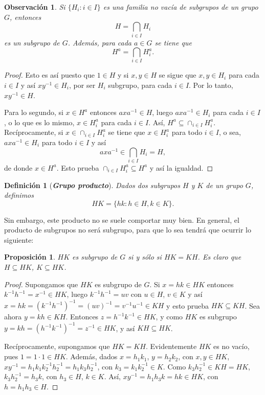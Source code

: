 \documentclass[12pt]{article}
\newtheorem{proposition}[theorem]{Proposición}
\newtheorem{definition}[theorem]{Definición}
\newtheorem{observation}{Observación}[theorem]
\begin{document}
\begin{observation}\label{ob:intGru} Si $\lbrace H_i : i \in I \rbrace$ es una familia no vacía de subgrupos de un grupo $G$, entonces $$H = \bigcap_{i \in I} H_i$$ es un subgrupo de $G$. Además, para cada $a \in G$ se tiene que $$H ^a = \bigcap_{i \in I} H_i^a.$$
\end{observation}
\begin{proof}
Esto es así puesto que $1 \in H$ y si $x,y \in H$ se sigue que $x,y \in H_i$ para cada $i \in I$ y así $xy^{-1} \in H_i$, por ser $H_i$ subgrupo, para cada $i \in I$. Por lo tanto, $xy^{-1} \in H$.

Para lo segundo, si $x \in H^a$ entonces $axa^{-1} \in H$, luego $axa^{-1} \in H_i$ para cada $i \in I$, o lo que es lo mismo, $x \in H_i^a$ para cada $i \in I$. Así, $ H^a \subseteq \cap_{i \in I}H_i^a.$ Recíprocamente, si $x \in \cap_{i \in I} H_i^a$ se tiene que $x \in H_i^a$ para todo $i \in I$, o sea, $axa^{-1} \in H_i$ para todo $i \in I$ y así $$axa^{-1} \in \bigcap_{i \in I} H_i = H,$$ de donde $x \in H^a$. Esto prueba $\cap_{i \in I} H_i^a \subseteq H^a$ y así la igualdad.

\end{proof}

\begin{definition}[\textbf{\textit{Grupo producto}}]Dados dos subgrupos $H$ y $K$ de un grupo $G$, definimos $$HK = \lbrace hk: h \in H, k \in K \rbrace.$$ 
\end{definition}

Sin embargo, este producto no se suele comportar muy bien. En general, el producto de subgrupos no será subgrupo, para que lo sea tendrá que ocurrir lo siguiente:

\begin{proposition}$HK$ es subgrupo de $G$ si y sólo si $HK = KH$. Es claro que $H \subseteq HK$, $K \subseteq HK$.
\end{proposition}
\begin{proof}
Supongamos que $HK$ es subgrupo de $G$. Si $x = hk \in HK$ entonces $k^{-1}h^{-1} = x^{-1} \in HK$, luego $k^{-1}h^{-1} = uv$ con $u \in H$, $v \in K$ y así $x = hk = (k^{-1}h^{-1})^{-1} = (uv)^{-1} = v^{-1}u^{-1} \in KH$ y esto prueba $HK \subseteq KH$. Sea ahora $y = kh \in KH$. Entonces $z = h^{-1}k^{-1} \in HK$, y como $HK$ es subgrupo $y = kh = (h^{-1}k^{-1})^{-1} = z^{-1} \in HK$, y así $KH \subseteq HK$.
 
Recíprocamente, supongamos que $HK = KH$. Evidentemente $HK$ es no vacío, pues $1 = 1 \cdot 1 \in HK$. Además, dados $x = h_{1}k_{1}$, $y = h_{2}k_{2}$, con $x,y \in HK$,$xy^{-1} = h_{1}k_{1}k_{2}^{-1}h_{2}^{-1} = h_{1}k_{3}h_{2}^{-1}$, con $k_{3} = k_{1}k_{2}^{-1} \in K$. Como $k_{3}h_{2}^{-1} \in KH = HK$, $k_{3}h_{2}^{-1} = h_{3}k$, con $h_{3} \in H$, $k \in K$. Así, $xy^{-1} = h_{1}h_{3}k = hk \in HK$, con $h = h_{1}h_{3} \in H$.

\end{proof}
\end{document}
